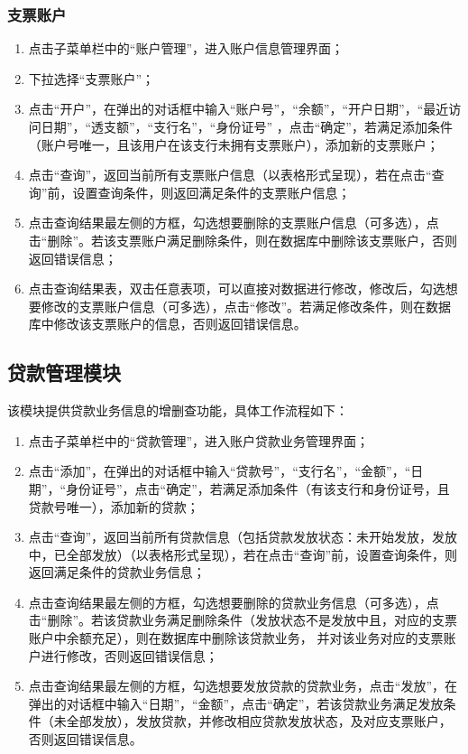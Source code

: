 \documentclass{ctexart}
\begin{document}
\subsubsection{\hei 支票账户}
\begin{enumerate}
    \item 点击子菜单栏中的“账户管理”，进入账户信息管理界面；
    \item 下拉选择“支票账户”；
    \item 点击“开户”，在弹出的对话框中输入“账户号”，“余额”，“开户日期”，“最近访问日期”，“透支额”，“支行名”，“身份证号”
    ，点击“确定”，若满足添加条件（账户号唯一，且该用户在该支行未拥有支票账户），添加新的支票账户；
    \item 点击“查询”，返回当前所有支票账户信息（以表格形式呈现），若在点击“查询”前，设置查询条件，则返回满足条件的支票账户信息；
    \item 点击查询结果最左侧的方框，勾选想要删除的支票账户信息（可多选），点击“删除”。若该支票账户满足删除条件，则在数据库中删除该支票账户，否则返回错误信息；
    \item 点击查询结果表，双击任意表项，可以直接对数据进行修改，修改后，勾选想要修改的支票账户信息（可多选），点击“修改”。若满足修改条件，则在数据库中修改该支票账户的信息，否则返回错误信息。
\end{enumerate}
\subsection{\hei 贷款管理模块}
该模块提供贷款业务信息的增删查功能，具体工作流程如下：
\begin{enumerate}
    \item 点击子菜单栏中的“贷款管理”，进入账户贷款业务管理界面；
    \item 点击“添加”，在弹出的对话框中输入“贷款号”，“支行名”，“金额”，“日期”，“身份证号”，点击“确定”，若满足添加条件（有该支行和身份证号，且贷款号唯一），添加新的贷款；
    \item 点击“查询”，返回当前所有贷款信息（包括贷款发放状态：未开始发放，发放中，已全部发放）（以表格形式呈现），若在点击“查询”前，设置查询条件，则返回满足条件的贷款业务信息；
    \item 点击查询结果最左侧的方框，勾选想要删除的贷款业务信息（可多选），点击“删除”。若该贷款业务满足删除条件（发放状态不是发放中且，对应的支票账户中余额充足），则在数据库中删除该贷款业务，
    并对该业务对应的支票账户进行修改，否则返回错误信息；
    \item 点击查询结果最左侧的方框，勾选想要发放贷款的贷款业务，点击“发放”，在弹出的对话框中输入“日期”，“金额”，点击“确定”，若该贷款业务满足发放条件（未全部发放），发放贷款，并修改相应贷款发放状态，及对应支票账户，
    否则返回错误信息。
\end{enumerate}
\end{document}
